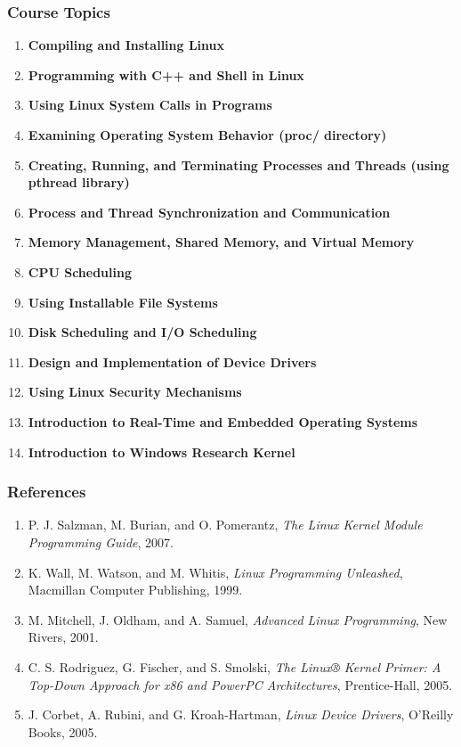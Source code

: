 \documentclass[12pt]{article}
\begin{document}
\subsubsection*{Course Topics}
\begin{enumerate}
    \item \textbf{Compiling and Installing Linux}
    \item \textbf{Programming with C++ and Shell in Linux}
    \item \textbf{Using Linux System Calls in Programs}
    \item \textbf{Examining Operating System Behavior (proc/ directory)}
    \item \textbf{Creating, Running, and Terminating Processes and Threads (using pthread library)}
    \item \textbf{Process and Thread Synchronization and Communication}
    \item \textbf{Memory Management, Shared Memory, and Virtual Memory}
    \item \textbf{CPU Scheduling}
    \item \textbf{Using Installable File Systems}
    \item \textbf{Disk Scheduling and I/O Scheduling}
    \item \textbf{Design and Implementation of Device Drivers}
    \item \textbf{Using Linux Security Mechanisms}
    \item \textbf{Introduction to Real-Time and Embedded Operating Systems}
    \item \textbf{Introduction to Windows Research Kernel}
\end{enumerate}

\subsubsection*{References}
\begin{enumerate}
    \item P. J. Salzman, M. Burian, and O. Pomerantz, \textit{The Linux Kernel Module Programming Guide}, 2007.
    \item K. Wall, M. Watson, and M. Whitis, \textit{Linux Programming Unleashed}, Macmillan Computer Publishing, 1999.
    \item M. Mitchell, J. Oldham, and A. Samuel, \textit{Advanced Linux Programming}, New Rivers, 2001.
    \item C. S. Rodriguez, G. Fischer, and S. Smolski, \textit{The Linux® Kernel Primer: A Top-Down Approach for x86 and PowerPC Architectures}, Prentice-Hall, 2005.
    \item J. Corbet, A. Rubini, and G. Kroah-Hartman, \textit{Linux Device Drivers}, O'Reilly Books, 2005.
\end{enumerate}
\end{document}
